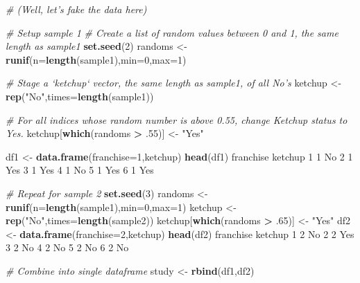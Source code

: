 \documentclass[]{book}
\newenvironment{Shaded}{\begin{snugshade}}{\end{snugshade}}
\newcommand{\CommentTok}[1]{\textcolor[rgb]{0.56,0.35,0.01}{\textit{#1}}}
\newcommand{\DataTypeTok}[1]{\textcolor[rgb]{0.13,0.29,0.53}{#1}}
\newcommand{\DecValTok}[1]{\textcolor[rgb]{0.00,0.00,0.81}{#1}}
\newcommand{\FloatTok}[1]{\textcolor[rgb]{0.00,0.00,0.81}{#1}}
\newcommand{\KeywordTok}[1]{\textcolor[rgb]{0.13,0.29,0.53}{\textbf{#1}}}
\newcommand{\NormalTok}[1]{#1}
\newcommand{\OperatorTok}[1]{\textcolor[rgb]{0.81,0.36,0.00}{\textbf{#1}}}
\newcommand{\StringTok}[1]{\textcolor[rgb]{0.31,0.60,0.02}{#1}}
\begin{document}
\begin{Shaded}
\begin{Highlighting}[]
\CommentTok{# (Well, let's fake the data here)}

\CommentTok{# Setup sample 1}
\CommentTok{# Create a list of random values between 0 and 1, the same length as sample1}
\KeywordTok{set.seed}\NormalTok{(}\DecValTok{2}\NormalTok{)}
\NormalTok{randoms <-}\StringTok{ }\KeywordTok{runif}\NormalTok{(}\DataTypeTok{n=}\KeywordTok{length}\NormalTok{(sample1),}\DataTypeTok{min=}\DecValTok{0}\NormalTok{,}\DataTypeTok{max=}\DecValTok{1}\NormalTok{)}

\CommentTok{# Stage a `ketchup` vector, the same length as sample1, of all No's}
\NormalTok{ketchup <-}\StringTok{ }\KeywordTok{rep}\NormalTok{(}\StringTok{"No"}\NormalTok{,}\DataTypeTok{times=}\KeywordTok{length}\NormalTok{(sample1))}

\CommentTok{# For all indices whose random number is above 0.55, change Ketchup status to Yes.}
\NormalTok{ketchup[}\KeywordTok{which}\NormalTok{(randoms }\OperatorTok{>}\StringTok{ }\FloatTok{.55}\NormalTok{)] <-}\StringTok{ "Yes"}

\NormalTok{df1 <-}\StringTok{ }\KeywordTok{data.frame}\NormalTok{(}\DataTypeTok{franchise=}\DecValTok{1}\NormalTok{,ketchup)}
\KeywordTok{head}\NormalTok{(df1)}
\NormalTok{  franchise ketchup}
\DecValTok{1}         \DecValTok{1}\NormalTok{      No}
\DecValTok{2}         \DecValTok{1}\NormalTok{     Yes}
\DecValTok{3}         \DecValTok{1}\NormalTok{     Yes}
\DecValTok{4}         \DecValTok{1}\NormalTok{      No}
\DecValTok{5}         \DecValTok{1}\NormalTok{     Yes}
\DecValTok{6}         \DecValTok{1}\NormalTok{     Yes}

\CommentTok{# Repeat for sample 2}
\KeywordTok{set.seed}\NormalTok{(}\DecValTok{3}\NormalTok{)}
\NormalTok{randoms <-}\StringTok{ }\KeywordTok{runif}\NormalTok{(}\DataTypeTok{n=}\KeywordTok{length}\NormalTok{(sample1),}\DataTypeTok{min=}\DecValTok{0}\NormalTok{,}\DataTypeTok{max=}\DecValTok{1}\NormalTok{)}
\NormalTok{ketchup <-}\StringTok{ }\KeywordTok{rep}\NormalTok{(}\StringTok{"No"}\NormalTok{,}\DataTypeTok{times=}\KeywordTok{length}\NormalTok{(sample2))}
\NormalTok{ketchup[}\KeywordTok{which}\NormalTok{(randoms }\OperatorTok{>}\StringTok{ }\FloatTok{.65}\NormalTok{)] <-}\StringTok{ "Yes"}
\NormalTok{df2 <-}\StringTok{ }\KeywordTok{data.frame}\NormalTok{(}\DataTypeTok{franchise=}\DecValTok{2}\NormalTok{,ketchup)}
\KeywordTok{head}\NormalTok{(df2)}
\NormalTok{  franchise ketchup}
\DecValTok{1}         \DecValTok{2}\NormalTok{      No}
\DecValTok{2}         \DecValTok{2}\NormalTok{     Yes}
\DecValTok{3}         \DecValTok{2}\NormalTok{      No}
\DecValTok{4}         \DecValTok{2}\NormalTok{      No}
\DecValTok{5}         \DecValTok{2}\NormalTok{      No}
\DecValTok{6}         \DecValTok{2}\NormalTok{      No}

\CommentTok{# Combine into single dataframe}
\NormalTok{study <-}\StringTok{ }\KeywordTok{rbind}\NormalTok{(df1,df2)}
\end{Highlighting}
\end{Shaded}
\end{document}

